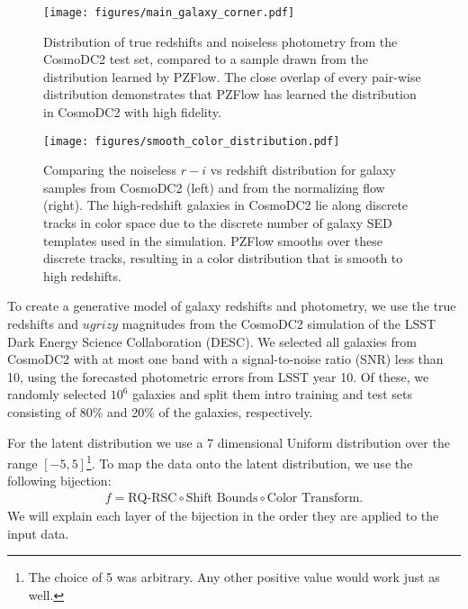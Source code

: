 \documentclass[twocolumn,twocolappendix,linenumbers]{aastex631}
\begin{document}
\begin{figure*}[t]
    \begin{centering}
        \texttt{[image: figures/main\_galaxy\_corner.pdf]}
        \caption{
            Distribution of true redshifts and noiseless photometry from the CosmoDC2 test set, compared to a sample drawn from the distribution learned by PZFlow.
            The close overlap of every pair-wise distribution demonstrates that PZFlow has learned the distribution in CosmoDC2 with high fidelity.
        }
        \label{fig:main-corner}
    \end{centering}
\end{figure*}

\begin{figure*}[t]
    \begin{centering}
        \texttt{[image: figures/smooth\_color\_distribution.pdf]}
        \caption{
            Comparing the noiseless $r-i$ vs redshift distribution for galaxy samples from CosmoDC2 (left) and from the normalizing flow (right).
            The high-redshift galaxies in CosmoDC2 lie along discrete tracks in color space due to the discrete number of galaxy SED templates used in the simulation.
            PZFlow smooths over these discrete tracks, resulting in a color distribution that is smooth to high redshifts.
        }
        \label{fig:smooth-color-dist}
    \end{centering}
\end{figure*}

To create a generative model of galaxy redshifts and photometry, we use the true redshifts and $ugrizy$ magnitudes from the CosmoDC2 simulation \citep{dc2, cosmodc2} of the LSST Dark Energy Science Collaboration (DESC).
We selected all galaxies from CosmoDC2 with at most one band with a signal-to-noise ratio (SNR) less than 10, using the forecasted photometric errors from LSST year 10.
Of these, we randomly selected $10^6$ galaxies and split them intro training and test sets consisting of 80\% and 20\% of the galaxies, respectively.

For the latent distribution we use a 7 dimensional Uniform distribution over the range $[-5, 5]$\footnote{The choice of 5 was arbitrary. Any other positive value would work just as well.}.
To map the data onto the latent distribution, we use the following bijection:
\begin{align}
    f = \text{RQ-RSC} \circ \text{Shift Bounds} \circ \text{Color Transform}.
\end{align}
We will explain each layer of the bijection in the order they are applied to the input data.
\end{document}
